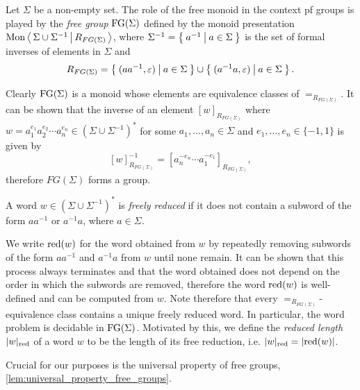 \begin{definition}%
  \label{def:free_group}
  \rocqok{}
Let $\Sigma$ be a non-empty set. The role of the free monoid in the context pf groups is played
by the \emph{free group} $\textrm{FG}(\Sigma)$ defined by the monoid presentation
$\textrm{Mon}\left\langle\, \Sigma \cup \Sigma^{-1} \,\middle|\, R_{FG(\Sigma)} \,\right\rangle$,
where $\Sigma^{-1} = \left\{\: a^{-1} \: \middle|\: a\in \Sigma \:\right\}$ is the set of formal inverses of elements in $\Sigma$ and
\[
  R_{FG(\Sigma)} = \left\{\: (aa^{-1},\varepsilon) \: \middle|\: a\in \Sigma \:\right\} \cup \left\{\: (a^{-1}a,\varepsilon) \: \middle|\: a\in\Sigma \:\right\}.
\]
\end{definition}
Clearly $\textrm{FG}(\Sigma)$ is a monoid whose elements are equivalence classes of $=_{R_{FG(\Sigma)}}$.
It can be shown that the inverse of an element
${[w]}_{R_{FG(\Sigma)}}$ where $w = a_1^{e_1}a_2^{e_2}\cdots a_n^{e_n}\in {\left(\Sigma\cup\Sigma^{-1}\right)}^\ast$
for some $a_1,\ldots, a_n\in \Sigma$ and $e_1,\ldots, e_n\in \{-1, 1\}$ is given by
\[
  {[w]}_{R_{FG(\Sigma)}} ^{-1} = {[a_n^{-e_n} \cdots a_1^{-e_1}]}_{R_{FG(\Sigma)}},
\]
therefore $FG(\Sigma)$ forms a group.


\begin{definition}%
  \label{def:freely_reduced}
  \rocqok{}
A word $w\in {\left(\Sigma\cup \Sigma^{-1}\right)}^\ast$ is \emph{freely reduced} if it does not
contain a subword of the form $aa^{-1}$ or $a^{-1}a$, where $a\in \Sigma$.
\end{definition}
We write $\textrm{red}(w)$ for
the word obtained from $w$ by repeatedly removing subwords of the form $aa^{-1}$ and $a^{-1}a$
from $w$ until none remain. It can be shown that this process always terminates and that the word
obtained does not depend on the order in which the subwords are removed, therefore the word
$\textrm{red}(w)$ is well-defined and can be computed from $w$. Note therefore that every
$=_{R_{FG(\Sigma)}}$-equivalence class contains a unique freely reduced word. In particular, the
word problem is decidable in $\textrm{FG}(\Sigma)$. Motivated by this, we define the
\emph{reduced length} $|w|_{\textrm{red}}$ of a word $w$ to be the length of its free reduction,
i.e. $|w|_{\textrm{red}} = |\textrm{red}(w)|$.

Crucial for our purposes is the universal property of free groups, \cref{lem:universal_property_free_groups}.

